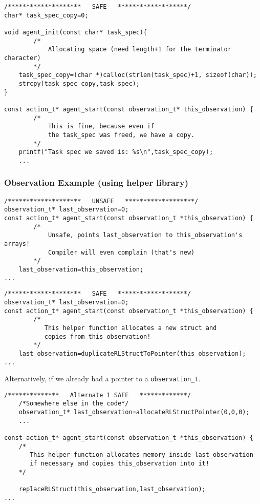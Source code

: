 \documentclass[11pt]{article}
\begin{document}
\begin{verbatim}
/********************   SAFE   *******************/
char* task_spec_copy=0;
	
void agent_init(const char* task_spec){
        /*
            Allocating space (need length+1 for the terminator character)
        */
    task_spec_copy=(char *)calloc(strlen(task_spec)+1, sizeof(char));
    strcpy(task_spec_copy,task_spec);
}

const action_t* agent_start(const observation_t* this_observation) {
        /*
            This is fine, because even if 
            the task_spec was freed, we have a copy.
        */
    printf("Task spec we saved is: %s\n",task_spec_copy);
    ...
\end{verbatim}


\subsubsection{Observation Example (using helper library)}


\begin{verbatim}
/********************   UNSAFE   *******************/
observation_t* last_observation=0;
const action_t* agent_start(const observation_t *this_observation) {
        /*
            Unsafe, points last_observation to this_observation's arrays!
            Compiler will even complain (that's new)		
        */
    last_observation=this_observation;
...
\end{verbatim}

\begin{verbatim}
/********************   SAFE   *******************/
observation_t* last_observation=0;
const action_t* agent_start(const observation_t *this_observation) {
        /*
           This helper function allocates a new struct and 
           copies from this_observation!
        */
    last_observation=duplicateRLStructToPointer(this_observation);
...
\end{verbatim}

Alternatively, if we already had a pointer to a \texttt{observation\_t}.
\begin{verbatim}
/**************   Alternate 1 SAFE   *************/
    /*Somewhere else in the code*/
    observation_t* last_observation=allocateRLStructPointer(0,0,0);
    ...

const action_t* agent_start(const observation_t *this_observation) {
    /*
       This helper function allocates memory inside last_observation
       if necessary and copies this_observation into it!
    */

    replaceRLStruct(this_observation,last_observation);
...
\end{verbatim}
\end{document}

